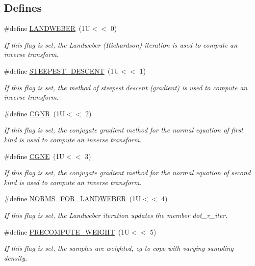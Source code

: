 \subsection*{Defines}
\begin{CompactItemize}
\item 
\#define \hyperlink{group__solver_ga35}{LANDWEBER}~(1U$<$$<$ 0)
\begin{CompactList}\small\item\em If this flag is set, the Landweber (Richardson) iteration is used to compute an inverse transform. \item\end{CompactList}\item 
\#define \hyperlink{group__solver_ga36}{STEEPEST\_\-DESCENT}~(1U$<$$<$ 1)
\begin{CompactList}\small\item\em If this flag is set, the method of steepest descent (gradient) is used to compute an inverse transform. \item\end{CompactList}\item 
\#define \hyperlink{group__solver_ga37}{CGNR}~(1U$<$$<$ 2)
\begin{CompactList}\small\item\em If this flag is set, the conjugate gradient method for the normal equation of first kind is used to compute an inverse transform. \item\end{CompactList}\item 
\#define \hyperlink{group__solver_ga38}{CGNE}~(1U$<$$<$ 3)
\begin{CompactList}\small\item\em If this flag is set, the conjugate gradient method for the normal equation of second kind is used to compute an inverse transform. \item\end{CompactList}\item 
\#define \hyperlink{group__solver_ga39}{NORMS\_\-FOR\_\-LANDWEBER}~(1U$<$$<$ 4)
\begin{CompactList}\small\item\em If this flag is set, the Landweber iteration updates the member dot\_\-r\_\-iter. \item\end{CompactList}\item 
\#define \hyperlink{group__solver_ga40}{PRECOMPUTE\_\-WEIGHT}~(1U$<$$<$ 5)
\begin{CompactList}\small\item\em If this flag is set, the samples are weighted, eg to cope with varying sampling density. \item\end{CompactList}\item 

\end{CompactItemize}
